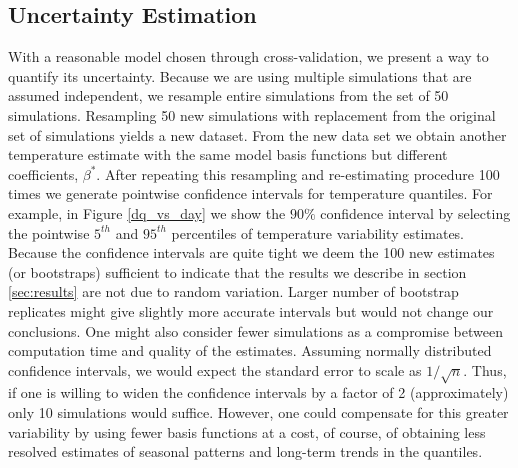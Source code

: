\documentclass{ametsoc}
\begin{document}
\subsection{Uncertainty Estimation}
\label{app:uq}
With a reasonable model chosen through cross-validation, we present a way to quantify its uncertainty. Because we are using multiple simulations that are assumed independent, we resample entire simulations from the set of 50 simulations. Resampling 50 new simulations with replacement from the original set of simulations yields a new dataset. From the new data set we obtain another temperature estimate with the same model basis functions but different coefficients, $\beta^{\ast}$. After repeating this resampling and re-estimating procedure 100 times we generate pointwise confidence intervals for temperature quantiles. For example, in Figure \ref{dq_vs_day} we show the $90\%$ confidence interval by selecting the pointwise $5^{th}$ and $95^{th}$ percentiles of temperature variability estimates. Because the confidence intervals are quite tight we deem the 100 new estimates (or bootstraps) sufficient to indicate that the results we describe in section \ref{sec:results} are not due to random variation. Larger number of bootstrap replicates might give slightly more accurate intervals but would not change our conclusions. One might also consider fewer simulations as a compromise between computation time and quality of the estimates. Assuming normally distributed confidence intervals, we would expect the standard error to scale as $1/\sqrt{n}$. Thus, if one is willing to widen the confidence intervals by a factor of 2 (approximately) only 10 simulations would suffice. However, one could compensate for this greater variability by using fewer basis functions at a cost, of course, of obtaining less resolved estimates of seasonal patterns and long-term trends in the quantiles.




\end{document}
